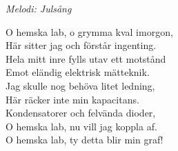 {\footnotesize\textit{Melodi: Julsång}}\par
\vspace{10pt}
O hemska lab, o grymma kval imorgon,\\
Här sitter jag och förstår ingenting.\\
Hela mitt inre fylls utav ett motstånd\\
Emot eländig elektrisk mätteknik.\\
Jag skulle nog behöva litet ledning,\\
Här räcker inte min kapacitans.\\
Kondensatorer och felvända dioder,\\
O hemska lab, nu vill jag koppla af.\\
O hemska lab, ty detta blir min graf!
